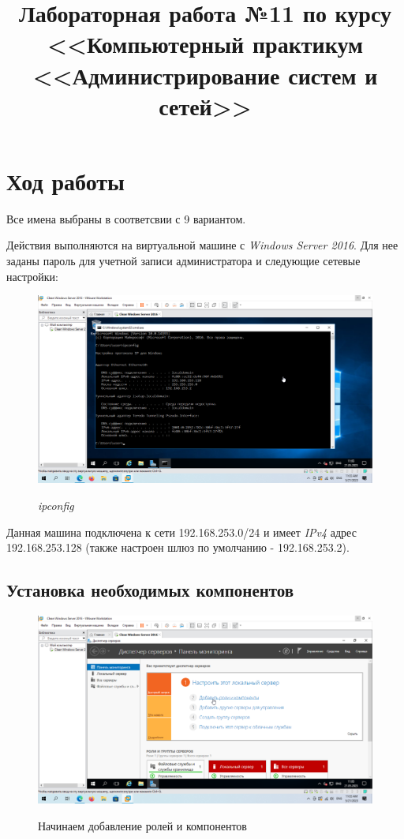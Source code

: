 \documentclass[a4paper]{article}
\title{
  Лабораторная работа №11 по курсу \\
  <<Компьютерный практикум <<Администрирование систем и сетей>>  
}
\begin{document}
  \templatedtitlepage
  
  \toc
  \section{Ход работы}

  Все имена выбраны в соответсвии с 9 вариантом.

  Действия выполняются на виртуальной машине с \textit{Windows Server 2016}.
  Для нее заданы пароль для учетной записи администратора и следующие сетевые настройки:

  \begin{figure}[H]
    \centering
    \includegraphics[width=\textwidth]{11_0001}
    \label{img:1}
    \caption{\textit{ipconfig}}
  \end{figure}

  Данная машина подключена к сети 192.168.253.0/24 и имеет \textit{IPv4} адрес
  192.168.253.128 (также настроен шлюз по умолчанию - 192.168.253.2).

  \subsection{Установка необходимых компонентов}

  \begin{figure}[H]
    \centering
    \includegraphics[width=\textwidth]{11_0002}
    \label{img:2}
    \caption{Начинаем добавление ролей и компонентов}
  \end{figure}
\end{document}
